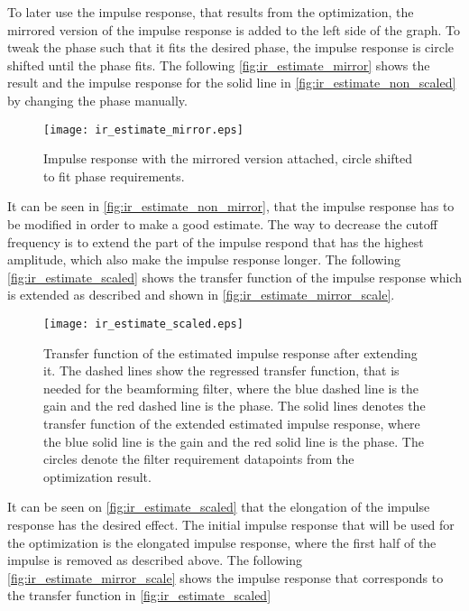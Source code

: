 To later use the impulse response, that results from the optimization, the mirrored version of the impulse response is added to the left side of the graph. To tweak the phase such that it fits the desired phase, the impulse response is circle shifted until the phase fits. The following \autoref{fig:ir_estimate_mirror} shows the result and the impulse response for the solid line in \autoref{fig:ir_estimate_non_scaled} by changing the phase manually.



\begin{figure}[H]
	\centering
	\texttt{[image: ir\_estimate\_mirror.eps]}
	\caption{Impulse response with the mirrored version attached, circle shifted to fit phase requirements.}
		\label{fig:ir_estimate_mirror}
\end{figure}


It can be seen in \autoref{fig:ir_estimate_non_mirror}, that the impulse response has to be modified in order to make a good estimate. The way to decrease the cutoff frequency is to extend the part of the impulse respond that has the highest amplitude, which also make the impulse response longer. %
The following  \autoref{fig:ir_estimate_scaled} shows the transfer function of the impulse response which is extended as described and shown in \autoref{fig:ir_estimate_mirror_scale}.


\begin{figure}[H]
	\centering
	\texttt{[image: ir\_estimate\_scaled.eps]}
	\caption{Transfer function of the estimated impulse response after extending it. The dashed lines show the regressed transfer function, that is needed for the beamforming filter,  where the blue dashed line is the gain and the red dashed line is the phase. The solid lines denotes the transfer function of the extended estimated impulse response, where the blue solid line is the gain and the red solid line is the phase. The circles denote the filter requirement datapoints from the optimization result.}
		\label{fig:ir_estimate_scaled}
\end{figure}


It can be seen on \autoref{fig:ir_estimate_scaled} that the elongation of the impulse response has the desired effect. The initial impulse response that will be used for the optimization is the elongated impulse response, where the first half of the impulse is removed as described above. The following  \autoref{fig:ir_estimate_mirror_scale} shows the impulse response that corresponds to the transfer function in \autoref{fig:ir_estimate_scaled}


